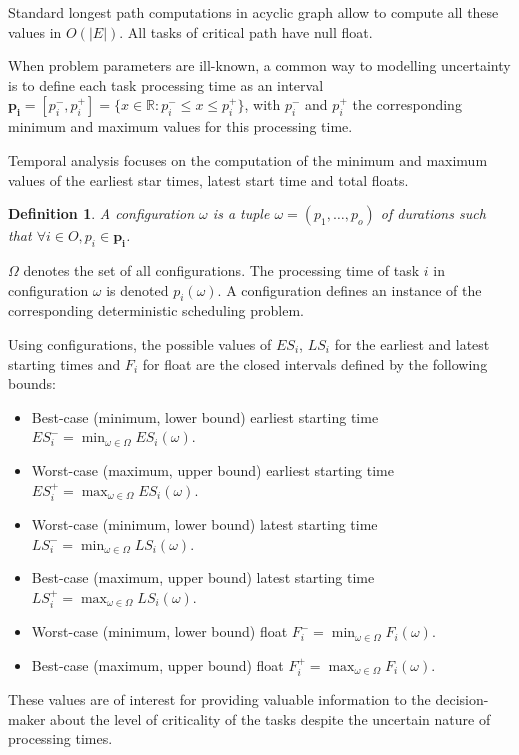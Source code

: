 \documentclass[preprint]{elsarticle}
\newtheorem{definition}{Definition}
\begin{document}
Standard longest path computations in acyclic graph allow to compute all these values in $O(|E|)$. All tasks of critical path have null float.

When problem parameters are ill-known, a common way to modelling uncertainty is to define each task processing time as an interval  $\mathbf{p_i}=[p_i^-,p_i^+]=\{x \in \mathbb{R}: p_i^- \leq x \leq p_i^+\}$, with $p_i^-$ and $p_i^+$ the corresponding minimum and maximum values for this processing time.

Temporal analysis focuses on the computation of the minimum and maximum values of the earliest star times, latest start time and total floats.

\begin{definition}
A configuration $\omega$ is a tuple $\omega = (p_1, \dots, p_o)$ of durations such that $\forall i \in O, p_i \in \mathbf{p_i}$.
\end{definition}

$\Omega$ denotes the set of all configurations. The processing time of task $i$ in configuration $\omega$ is denoted $p_i(\omega)$. A configuration defines an instance of the corresponding deterministic scheduling problem.

Using configurations, the possible values of  $ES_i$, $LS_i$ for the earliest and latest starting times and $F_i$ for float are the closed intervals defined by the following bounds:
\begin{itemize}
\item Best-case (minimum, lower bound) earliest starting time $ES_i^- =\min_{\omega \in \Omega} ES_i(\omega)$.
\item Worst-case (maximum, upper bound) earliest starting time $ES_i^+ =\max_{\omega \in \Omega} ES_i(\omega)$.
\item Worst-case (minimum, lower bound) latest starting time $LS_i^- =\min_{\omega \in \Omega} LS_i(\omega)$.
\item Best-case (maximum, upper bound) latest starting time $LS_i^+ =\max_{\omega \in \Omega} LS_i(\omega)$.
\item Worst-case (minimum, lower bound) float $F_i^- =\min_{\omega \in \Omega} F_i(\omega)$.
\item Best-case (maximum, upper bound) float $F_i^+ =\max_{\omega \in \Omega} F_i(\omega)$.
\end{itemize}

These values are of interest for providing valuable information to the decision-maker about the level of criticality of the tasks despite the uncertain nature of processing times.
\end{document}

